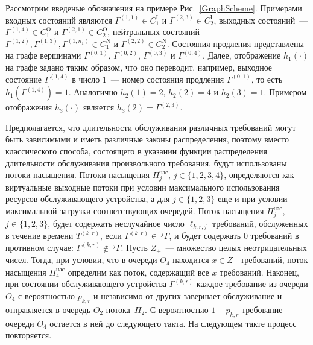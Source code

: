 \documentclass[a4paper,12pt,russian]{extarticle}
\newcommand{\G}{\Gamma}
\newcommand{\ga}[1]{\Gamma^{\left( #1 \right)} }
\newcommand{\Tt}[1]{T^{\left( #1 \right)} }
\begin{document}
Рассмотрим введеные обозначения на примере Рис.~\ref{GraphScheme}. Примерами входных состояний являются $\ga{1,1} \in C_1^{\mathrm{I}}$ и $\ga{2,3} \in C_2^{\mathrm{I}}$, выходных состояний~--- $\ga{1,4} \in C_1^{\mathrm{O}}$ и $\ga{2,1} \in C_2^{\mathrm{O}}$, нейтральных состояний~--- $\ga{1,2}, \ga{1,3}, \ga{1,n_1} \in C_1^{\mathrm{N}}$ и $\ga{2,2} \in C_2^{\mathrm{N}}$. Состояния продления представлены на графе вершинами $\ga{0,1}$, $\ga{0,2}$, $\ga{0,3}$ и $\ga{0,4}$. Далее, отображение $h_1(\cdot)$ на графе задано таким образом, что оно переводит, например, выходное состояние $\ga{1,4}$ в число $1$~--- номер состояния продления $\ga{0,1}$, то есть $h_1(\ga{1,4})=1$. Аналогично $h_2(1)=2$, $h_2(2)=4$ и $h_2(3)=1$. Примером отображения $h_3(\cdot)$ является $h_3(2)=\ga{2,3}$.


Предполагается, что длительности обслуживания различных требований могут быть зависимыми и иметь различные законы распределения, поэтому вместо классического способа, состоящего в указании функции распределения длительности обслуживания произвольного требования, будут использованы потоки насыщения. Потоки насыщения $\Pi^{\mathrm{\text{нас}}}_j$, $j \in \{1,2,3,4\}$, определяются как виртуальные выходные потоки при 
условии максимального использования ресурсов обслуживающего устройства, а для $j\in \{1, 2, 3\}$ еще и при условии максимальной загрузки соответствующих очередей. Поток насыщения $\Pi^{\mathrm{\text{нас}}}_j$, $j\in \{1,2,3\}$, будет содержать неслучайное число $\ell_{k,r,j}$ требований, обслуженных в течение времени $\Tt{k,r}$, если $\ga{k,r} \in~^j\G$, и будет содержать $0$ требований в противном случае: $\ga{k,r} \notin ~^j\G$. Пусть $Z_+$~--- множество целых неотрицательных чисел. Тогда, при условии, что в очереди $O_4$ находится $x \in Z_+$ требований, поток насыщения $\Pi^{\mathrm{\text{нас}}}_4$ определим как поток, содержащий все $x$ требований.
Наконец, при состоянии обслуживающего устройства $\ga{k,r}$ каждое требование из очереди $O_4$ с вероятностью $p_{k,r}$ и независимо от других завершает обслуживание и отправляется в очередь $O_2$ потока~$\Pi_2$. С вероятностью $1-p_{k,r}$ требование очереди $O_4$ остается в ней до следующего такта. На следующем такте процесс повторяется.
\end{document}
